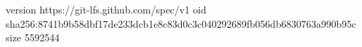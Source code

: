 version https://git-lfs.github.com/spec/v1
oid sha256:8741b9b58dbf17de233dcb1e8c83d0c3c040292689fb056db6830763a990b95c
size 5592544
